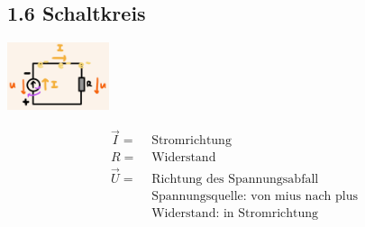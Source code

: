 \subsection*{1.6 Schaltkreis}
\vspace{-1mm}
\begin{minipage}{0.49\linewidth}
    \begin{footnotesize}
        \begin{center}
            \vspace{2mm}
            \includegraphics[width = 30mm]{src/images/schaltkreis.png}
        \end{center}
    \end{footnotesize}
\end{minipage}
\begin{minipage}{0.5\linewidth}
    \begin{scriptsize}
        \begin{center}
            \begin{align*}
                \overrightarrow{I} = &\text{ Stromrichtung}
                \\R = &\text{ Widerstand} 
                \\\overrightarrow{U} = &\text{ Richtung des Spannungsabfall}
                \\&\text{ Spannungsquelle: von mius nach plus}
                \\&\text{ Widerstand: in Stromrichtung}
            \end{align*}
        \end{center}
    \end{scriptsize}
\end{minipage}
\vspace{1mm}

